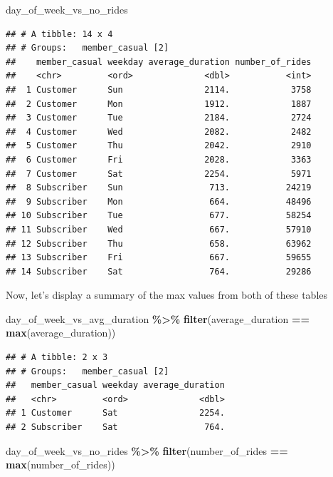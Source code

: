 \documentclass[
]{article}
\newenvironment{Shaded}{\begin{snugshade}}{\end{snugshade}}
\newcommand{\FunctionTok}[1]{\textcolor[rgb]{0.13,0.29,0.53}{\textbf{#1}}}
\newcommand{\NormalTok}[1]{#1}
\newcommand{\SpecialCharTok}[1]{\textcolor[rgb]{0.81,0.36,0.00}{\textbf{#1}}}
\begin{document}
\begin{Shaded}
\begin{Highlighting}[]
\NormalTok{day\_of\_week\_vs\_no\_rides}
\end{Highlighting}
\end{Shaded}

\begin{verbatim}
## # A tibble: 14 x 4
## # Groups:   member_casual [2]
##    member_casual weekday average_duration number_of_rides
##    <chr>         <ord>              <dbl>           <int>
##  1 Customer      Sun                2114.            3758
##  2 Customer      Mon                1912.            1887
##  3 Customer      Tue                2184.            2724
##  4 Customer      Wed                2082.            2482
##  5 Customer      Thu                2042.            2910
##  6 Customer      Fri                2028.            3363
##  7 Customer      Sat                2254.            5971
##  8 Subscriber    Sun                 713.           24219
##  9 Subscriber    Mon                 664.           48496
## 10 Subscriber    Tue                 677.           58254
## 11 Subscriber    Wed                 667.           57910
## 12 Subscriber    Thu                 658.           63962
## 13 Subscriber    Fri                 667.           59655
## 14 Subscriber    Sat                 764.           29286
\end{verbatim}

Now, let's display a summary of the max values from both of these tables

\begin{Shaded}
\begin{Highlighting}[]
\NormalTok{day\_of\_week\_vs\_avg\_duration }\SpecialCharTok{\%\textgreater{}\%}
  \FunctionTok{filter}\NormalTok{(average\_duration }\SpecialCharTok{==} \FunctionTok{max}\NormalTok{(average\_duration))}
\end{Highlighting}
\end{Shaded}

\begin{verbatim}
## # A tibble: 2 x 3
## # Groups:   member_casual [2]
##   member_casual weekday average_duration
##   <chr>         <ord>              <dbl>
## 1 Customer      Sat                2254.
## 2 Subscriber    Sat                 764.
\end{verbatim}

\begin{Shaded}
\begin{Highlighting}[]
\NormalTok{day\_of\_week\_vs\_no\_rides }\SpecialCharTok{\%\textgreater{}\%}
  \FunctionTok{filter}\NormalTok{(number\_of\_rides }\SpecialCharTok{==} \FunctionTok{max}\NormalTok{(number\_of\_rides))}
\end{Highlighting}
\end{Shaded}
\end{document}
